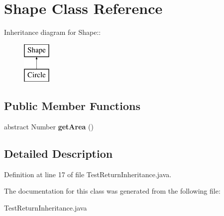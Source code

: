 \section{Shape Class Reference}
\label{classShape}
Inheritance diagram for Shape::\begin{figure}[H]
\begin{center}
\leavevmode
\includegraphics[height=2cm]{classShape}
\end{center}
\end{figure}
\subsection*{Public Member Functions}
\begin{CompactItemize}
\item 
abstract Number {\bf get\-Area} ()\label{classShape_8ae6f32689d68a8b9d93ebf22cc03f26}

\end{CompactItemize}


\subsection{Detailed Description}




Definition at line 17 of file Test\-Return\-Inheritance.java.

The documentation for this class was generated from the following file:\begin{CompactItemize}
\item 
Test\-Return\-Inheritance.java\end{CompactItemize}
